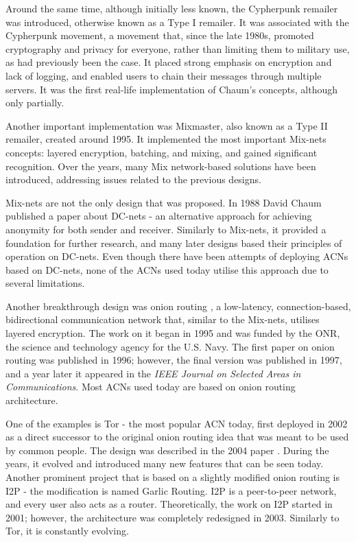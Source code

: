Around the same time, although initially less known, the Cypherpunk remailer was introduced, otherwise known as a Type I remailer. It was associated with the Cypherpunk movement, a movement that, since the late 1980s, promoted cryptography and privacy for everyone, rather than limiting them to military use, as had previously been the case. It placed strong emphasis on encryption and lack of logging, and enabled users to chain their messages through multiple servers. It was the first real-life implementation of Chaum’s concepts, although only partially.

Another important implementation was Mixmaster, also known as a Type II remailer, created around 1995. It implemented the most important Mix-nets concepts: layered encryption, batching, and mixing, and gained significant recognition. Over the years, many Mix network-based solutions have been introduced, addressing issues related to the previous designs.

Mix-nets are not the only design that was proposed. In 1988 David Chaum published a paper about DC-nets \cite{dc-nets} - an alternative approach for achieving anonymity for both sender and receiver. Similarly to Mix-nets, it provided a foundation for further research, and many later designs based their principles of operation on DC-nets. Even though there have been attempts of deploying ACNs based on DC-nets, none of the ACNs used today utilise this approach due to several limitations.

Another breakthrough design was onion routing \cite{onion-routing98, onion-routing-internet99}, a low-latency, connection-based, bidirectional communication network that, similar to the Mix-nets, utilises layered encryption. The work on it began in 1995 and was funded by the ONR, the science and technology agency for the U.S. Navy. The first paper on onion routing was published in 1996; however, the final version was published in 1997, and a year later it appeared in the \textit{IEEE Journal on Selected Areas in Communications}. Most ACNs used today are based on onion routing architecture.

One of the examples is Tor - the most popular ACN today, first deployed in 2002 as a direct successor to the original onion routing idea that was meant to be used by common people. The design was described in the 2004 paper \cite{tor-design}. During the years, it evolved and introduced many new features that can be seen today.
Another prominent project that is based on a slightly modified onion routing is I2P - the modification is named Garlic Routing. I2P is a peer-to-peer network, and every user also acts as a router. Theoretically, the work on I2P started in 2001; however, the architecture was completely redesigned in 2003. Similarly to Tor, it is constantly evolving.

